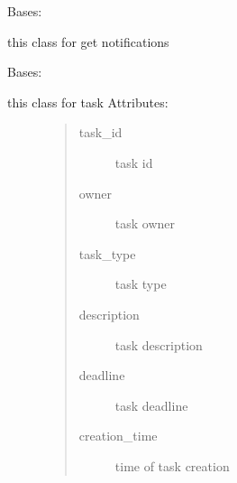 \documentclass[letterpaper,10pt,english]{sphinxmanual}
\begin{document}
\begin{fulllineitems}
\label{\detokenize{janta:janta.models.Notification}}
Bases: 

this class for get  notifications

\begin{fulllineitems}
\label{\detokenize{janta:janta.models.Notification.set_notification}}
\end{fulllineitems}


\end{fulllineitems}


\begin{fulllineitems}
\label{\detokenize{janta:janta.models.Task}}
Bases: 
\begin{description}
\item[{this class for task Attributes: }] \leavevmode\begin{quote}\begin{description}
\item[{task\_id}] \leavevmode
task id

\item[{owner}] \leavevmode
task owner

\item[{task\_type}] \leavevmode
task type

\item[{description}] \leavevmode
task description

\item[{deadline}] \leavevmode
task deadline

\item[{creation\_time}] \leavevmode
time of task creation

\end{description}\end{quote}

\end{description}

\begin{fulllineitems}
\label{\detokenize{janta:janta.models.Task.set_task}}
\end{fulllineitems}


\end{fulllineitems}
\end{document}
